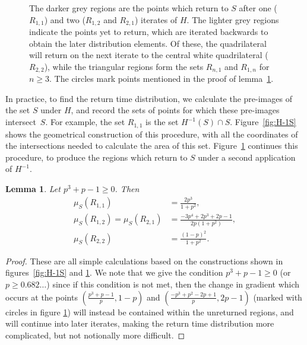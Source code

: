 \documentclass{iopart}
\newtheorem{lemma}{Lemma}
\begin{document}
\begin{figure}
	\caption{The darker grey regions are the points which return to $S$ after one ($R_{1,1}$) and two ($R_{1,2}$ and $R_{2,1}$) iterates of $H$. The lighter grey regions indicate the points yet to return, which are iterated backwards to obtain the later distribution elements. Of these, the quadrilateral will return on the next iterate to the central white quadrilateral ($R_{2,2}$), while the triangular regions form the sets $R_{n,1}$ and 
$R_{1,n}$ for $n \ge 3$. The circles mark points mentioned in the proof of lemma~\ref{lem:Rsets}.}
	\label{fig:R12}
\end{figure}

In practice, to find the return time distribution, we calculate the pre-images of the set $S$ under $H$, and record the sets of points for which these pre-images intersect~$S$. For example, the set $R_{1,1}$ is the set $H^{-1}(S) \cap S$. Figure~\ref{fig:H-1S} shows the geometrical construction of this procedure, with all the coordinates of the intersections needed to calculate the area of this set. Figure~\ref{fig:R12} continues this 
procedure, to produce the regions which return to $S$ under a second application of $H^{-1}$. 
\begin{lemma}\label{lem:Rsets}
Let $p^3 + p - 1 \ge 0$. Then
\begin{align*}
\mu_S (R_{1,1}) &= \frac{2p^3}{1+p^2}, \\
\mu_S (R_{1,2}) = \mu_S(R_{2,1}) & = \frac{-3p^4+2p^3+2p-1}{2p(1+p^2)}, \\
\mu_S(R_{2,2}) &= \frac{(1-p)^2}{1+p^2}.
\end{align*}
\end{lemma}

\begin{proof}
These are all simple calculations based on the constructions shown in figures~\ref{fig:H-1S} and \ref{fig:R12}. We note that we give the condition 
$p^3 + p - 1 \ge 0$  (or $ p \ge 0.682\ldots$) since if this condition is 
not met, then the change in gradient which occurs at the points $(\frac{p^3+p-1}{p},1-p)$ and $(\frac{-p^3 + p^2 - 2p + 1}{p},2p-1)$ (marked with circles in figure \ref{fig:R12}) will instead be contained within the unreturned regions, and will continue into later iterates, making the return 
time distribution more complicated, but not notionally more difficult.
\end{proof}
\end{document}
